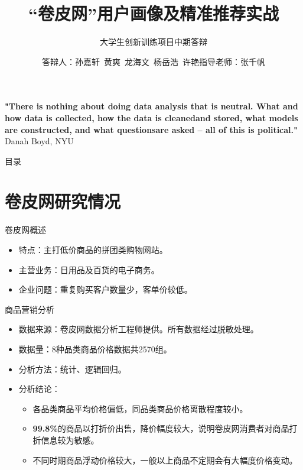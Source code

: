 \documentclass[10pt, aspectratio=32,handout]{beamer}
\title[中期答辩]{“卷皮网”用户画像及精准推荐实战}
\subtitle{大学生创新训练项目中期答辩}
\author[用户画像与机器学习实战]{答辩人：孙嘉轩\ 黄爽\ 龙海文\ 杨岳浩\ 许艳\newline \newline 指导老师：张千帆}
\institute[]{华中科技大学管理学院}
\begin{document}

\frame{\titlepage}
\begin{frame}
\textbf{"There is nothing about doing data analysis that is neutral.\newline\newline
What and how data is collected, how the data is cleaned\newline\newline and
stored, what models are constructed, and what questions\newline\newline are asked – all of this is political."}
\newline\newline Danah Boyd, NYU

\end{frame}

\begin{frame}{目录}
\tableofcontents
\end{frame}

\section{卷皮网研究情况}

\begin{frame}{卷皮网概述}
\begin{itemize}
\item 特点：主打低价商品的拼团类购物网站。\newline
\item 主营业务：日用品及百货的电子商务。\newline
\item 企业问题：重复购买客户数量少，客单价较低。
\end{itemize}
\end{frame}

\begin{frame}{商品营销分析}
\begin{itemize}
\item 数据来源：卷皮网数据分析工程师提供。所有数据经过脱敏处理。\newline
\item 数据量：8种品类商品价格数据共2570组。\newline
\item 分析方法：统计、逻辑回归。\newline
\item 分析结论：\newline
  \begin{itemize}
    \item 各品类商品平均价格偏低，同品类商品价格离散程度较小。\newline
    \item \textbf{99.8\%}的商品以打折价出售，降价幅度较大，说明卷皮网消费者对商品打折信息较为敏感。\newline
    \item 不同时期商品浮动价格较大，一般以上商品不定期会有大幅度价格变动。
  \end{itemize}
\end{itemize}
\end{frame}
\end{document}
